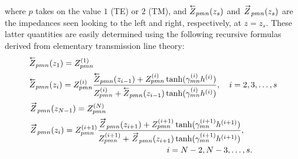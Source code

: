 where $p$ takes on the value $1$ (TE) or $2$ (TM), 
and $\Zleft_{pmn}(z_s)$ and $\Zright_{pmn}(z_s)$ are the impedances seen looking
to the left and right, respectively, at $z=z_s$.  These latter
quantities are easily determined using the following recursive
formulas derived from elementary transmission line theory:
\begin{subequations}
  \begin{align}
    &\Zleft_{pmn}(z_1) = Z_{pmn}^{(1)} \\
    &\Zleft_{pmn}(z_i) = Z_{pmn}^{(i)} 
    \frac%
    {\Zleft_{pmn}(z_{i-1}) + Z_{pmn}\eye\tanh(\gamma_{mn}\eye h^{(i)})}%
    {Z_{pmn}\eye + \Zleft_{pmn}(z_{i-1})\tanh(\gamma_{mn}\eye h^{(i)})}, \quad i =
    2,3,\ldots,s \\
    &\Zright_{pmn}(z_{N-1}) = Z_{pmn}^{(N)} \\
    &\Zright_{pmn}(z_i) = Z_{pmn}^{(i+1)} 
    \frac%
    {\Zright_{pmn}(z_{i+1}) + Z_{pmn}^{(i+1)}\tanh(\gamma_{mn}^{(i+1)} h^{(i+1)})}%
    {Z_{pmn}^{(i+1)} + \Zright_{pmn}(z_{i+1})\tanh(\gamma_{mn}^{(i+1)} h^{(i+1)})}, \notag \\
    & \mkern300mu i = N-2,N-3,\ldots,s.
  \end{align}
\end{subequations}

